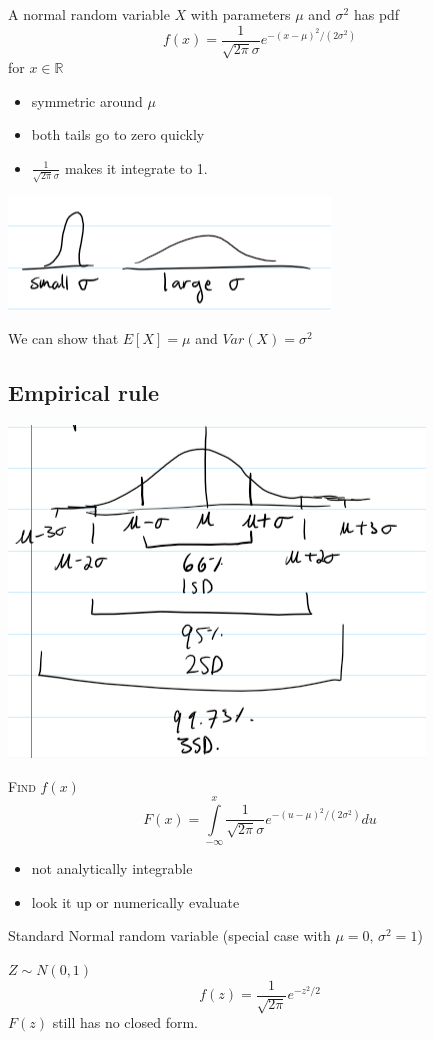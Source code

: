 \begin{defbox}
    A normal random variable $ X $ with parameters $ \mu $ and $ \sigma^2 $ has pdf
    \[ f(x)=\frac{1}{\sqrt{2\pi}\sigma}e^{-(x-\mu)^2/(2\sigma^2)}\]
    for $ x\in\mathbb{R} $
\end{defbox}
\begin{itemize}
    \item symmetric around $ \mu $
    \item both tails go to zero quickly
    \item $\frac{1}{\sqrt{2\pi}\sigma}$ makes it integrate to 1.
\end{itemize}

\begin{center}
    \includegraphics{sigma.png}
\end{center}
We can show that $ E[X]=\mu $ and $ Var(X)=\sigma^2 $

\subsection{Empirical rule}
\begin{center}
    \includegraphics{emp.png}
\end{center}

\textsc{Find $ f(x) $}
\[ F(x)=\int\limits_{-\infty}^{x} \frac{1}{\sqrt{2\pi}\sigma}e^{-(u-\mu)^2/(2\sigma^2)} d{u} \]
\begin{itemize}
    \item not analytically integrable
    \item look it up or numerically evaluate
\end{itemize}
Standard Normal random variable (special case with $ \mu=0,\,\sigma^2=1 $)

$ Z \sim N(0,1) $
\[ f(z)=\frac{1}{\sqrt{2\pi}}e^{-z^2/2} \]
$ F(z) $ still has no closed form.
